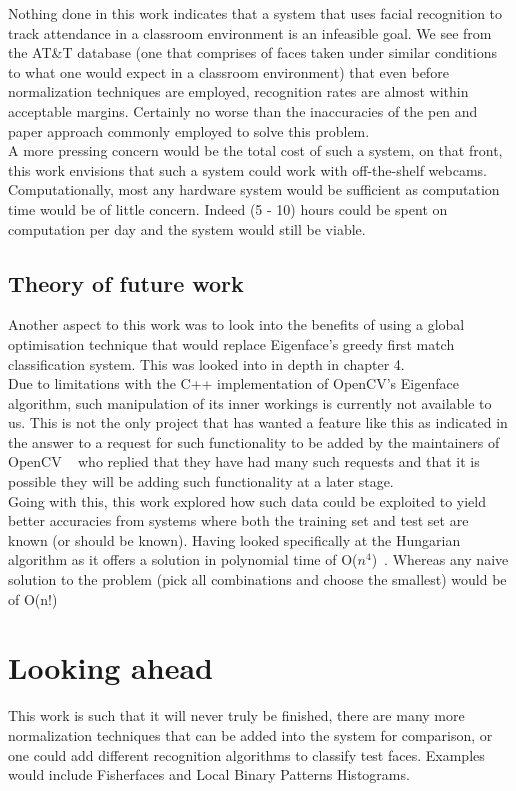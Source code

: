 Nothing done in this work indicates that a system that uses facial recognition to track attendance in a 
classroom environment is an infeasible goal.  We see from the AT\&T database (one that comprises of faces 
taken under similar conditions to what one would expect in a classroom environment) that even before 
normalization techniques are employed, recognition rates are almost within acceptable margins.  Certainly 
no worse than the inaccuracies of the pen and paper approach commonly employed to solve this problem. \\

A more pressing concern would be the total cost of such a system, on that front, this work envisions that such a
system could work with off-the-shelf webcams.  Computationally, most any hardware system would be sufficient as 
computation time would be of little concern.  Indeed (5 - 10) hours could be spent on computation per day and the 
system would still be viable.
 
\subsection{Theory of future work}
Another aspect to this work was to look into the benefits of using a global optimisation technique 
that would replace Eigenface's greedy first match classification system.  This was looked into in depth 
in chapter 4. \\

Due to limitations with the C++ implementation of OpenCV's Eigenface algorithm, such manipulation of its 
inner workings is currently not available to us.  This is not the only project that has wanted a feature 
like this as indicated in the answer to a request for such functionality to be added by the maintainers of OpenCV
~\cite{Eigenface_classification} who replied that they have had many such requests and that it is possible they 
will be adding such functionality at a later stage. \\

Going with this, this work explored how such data could be exploited to yield better accuracies from systems 
where both the training set and test set are known (or should be known).  Having looked specifically at the 
Hungarian algorithm as it offers a solution in polynomial time of O($n^4$)~\cite{munkres1957algorithms}.  Whereas 
any naive solution to the problem (pick all combinations and choose the smallest) would be of O(n!)

\section{Looking ahead}
This work is such that it will never truly be finished, there are many more normalization techniques that 
can be added into the system for comparison, or one could add different recognition algorithms to classify 
test faces.  Examples would include Fisherfaces and Local Binary Patterns Histograms. \\

